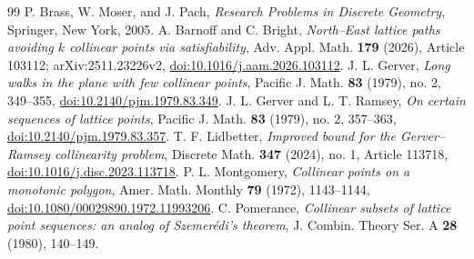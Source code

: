\documentclass[10pt,a4paper]{amsart}
\newcommand{\1}{\mathbf 1}
\begin{document}
\begin{thebibliography}{99}
 P. Brass, W. Moser, and J. Pach, \emph{Research Problems in Discrete Geometry}, Springer, New York, 2005.
 A. Barnoff and C. Bright, \emph{North--East lattice paths avoiding $k$ collinear points via satisfiability}, Adv. Appl. Math. \textbf{179} (2026), Article 103112; arXiv:2511.23226v2, \href{https://doi.org/10.1016/j.aam.2026.103112}{doi:10.1016/j.aam.2026.103112}.
 J. L. Gerver, \emph{Long walks in the plane with few collinear points}, Pacific J. Math. \textbf{83} (1979), no. 2, 349--355, \href{https://doi.org/10.2140/pjm.1979.83.349}{doi:10.2140/pjm.1979.83.349}.
 J. L. Gerver and L. T. Ramsey, \emph{On certain sequences of lattice points}, Pacific J. Math. \textbf{83} (1979), no. 2, 357--363, \href{https://doi.org/10.2140/pjm.1979.83.357}{doi:10.2140/pjm.1979.83.357}.
 T. F. Lidbetter, \emph{Improved bound for the Gerver--Ramsey collinearity problem}, Discrete Math. \textbf{347} (2024), no. 1, Article 113718, \href{https://doi.org/10.1016/j.disc.2023.113718}{doi:10.1016/j.disc.2023.113718}.
 P. L. Montgomery, \emph{Collinear points on a monotonic polygon}, Amer. Math. Monthly \textbf{79} (1972), 1143--1144, \href{https://doi.org/10.1080/00029890.1972.11993206}{doi:10.1080/00029890.1972.11993206}.
 C. Pomerance, \emph{Collinear subsets of lattice point sequences: an analog of Szemer\'edi's theorem}, J. Combin. Theory Ser. A \textbf{28} (1980), 140--149.
\end{thebibliography}
\end{document}
